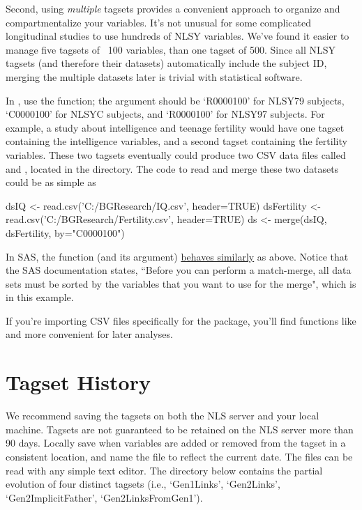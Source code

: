 \documentclass{article}\usepackage[]{graphicx}\usepackage[]{color}
\begin{document}
Second, using \emph{multiple} tagsets provides a convenient approach to organize and compartmentalize your variables.  It's not unusual for some complicated longitudinal studies to use hundreds of NLSY variables.  We've found it easier to manage five tagsets of ~100 variables, than one tagset of 500.  Since all NLSY tagsets (and therefore their datasets) automatically include the subject ID, merging the multiple datasets later is trivial with statistical software. 

In \R{}, use the  function; the  argument should be `R0000100' for NLSY79 subjects,  `C0000100' for NLSYC subjects, and `R0000100' for NLSY97 subjects.  For example, a study about intelligence and teenage fertility would have one tagset containing the intelligence variables, and a second tagset containing the fertility variables.  These two tagsets eventually could produce two CSV data files called  and , located in the  directory.  The \R{} code to read and merge these two datasets could be as simple as
\begin{Sinput}
dsIQ <- read.csv('C:/BGResearch/IQ.csv', header=TRUE)
dsFertility <- read.csv('C:/BGResearch/Fertility.csv', header=TRUE)
ds <- merge(dsIQ, dsFertility, by="C0000100")
\end{Sinput}

In SAS, the  function (and its  argument) \href{http://support.sas.com/documentation/cdl/en/basess/58133/HTML/default/viewer.htm#a001318494.htm}{behaves similarly} as above.  Notice that the SAS documentation states, ``Before you can perform a match-merge, all data sets must be sorted by the variables that you want to use for the merge", which is  in this example.

If you're importing CSV files specifically for the  package, you'll find functions like  and  more convenient for later analyses.
\section{Tagset History}
We recommend saving the tagsets on both the NLS server and your local machine.  Tagsets are not guaranteed to be retained on the NLS server more than 90 days.  Locally save when variables are added or removed from the tagset in a consistent location, and name the file to reflect the current date.  The files can be read with any simple text editor.  The directory below contains the partial evolution of four distinct tagsets (i.e., `Gen1Links', `Gen2Links', `Gen2ImplicitFather', `Gen2LinksFromGen1').
\end{document}
